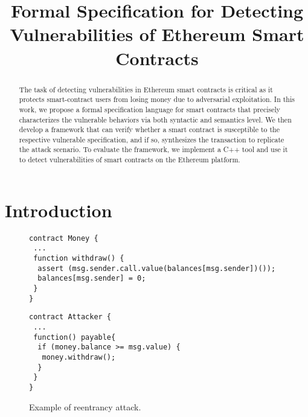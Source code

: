 \documentclass[runningheads]{llncs}
\begin{document}
%
\title{Formal Specification for Detecting Vulnerabilities of Ethereum Smart Contracts}
%
%
\author{}
%
\authorrunning{}
%
%
\maketitle              %
%
\begin{abstract}
The task of detecting vulnerabilities in Ethereum smart contracts is critical as it protects smart-contract users from losing money due to adversarial exploitation. In this work, we propose a formal specification language for smart contracts that precisely characterizes the vulnerable behaviors via both syntactic and semantics level. We then develop a framework that can verify whether a smart contract is susceptible to the respective vulnerable specification, and if so, synthesizes the transaction to replicate the attack scenario. To evaluate the framework, we implement a C++ tool and use it to detect vulnerabilities of smart contracts on the Ethereum platform.
\end{abstract}

\section{Introduction}

\begin{figure}
\begin{lstlisting}[language=Solidity]
contract Money {
 ...
 function withdraw() {
  assert (msg.sender.call.value(balances[msg.sender])());
  balances[msg.sender] = 0;
 }
}
\end{lstlisting}

\begin{lstlisting}[language=Solidity]
contract Attacker {
 ...
 function() payable{
  if (money.balance >= msg.value) {
   money.withdraw();
  }
 }
}
\end{lstlisting}
\caption{Example of reentrancy attack.}\label{fig:ex1}
\end{figure}
\end{document}
